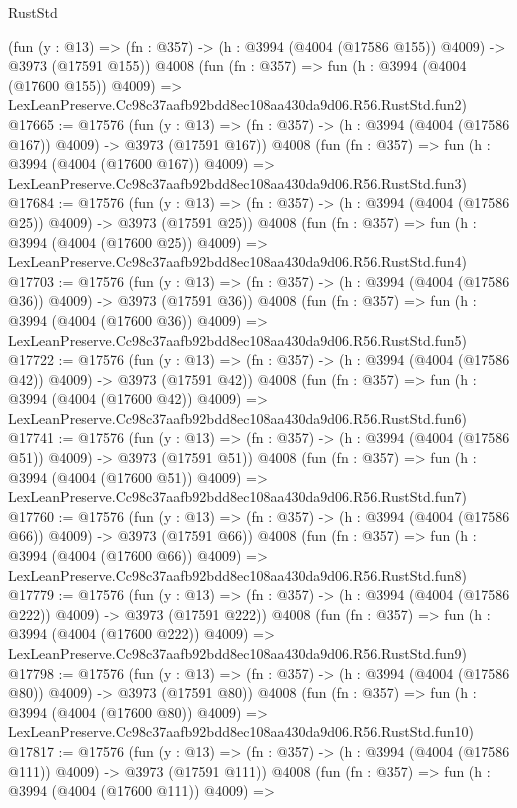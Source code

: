 \begin{lexlean}{RustStd}
\begin{coremodule}
    (fun (y : @13) => (fn : @357) -> (h : @3994 (@4004 (@17586 @155)) @4009) -> @3973 (@17591 @155))
    @4008
    (fun (fn : @357) =>
    fun (h : @3994 (@4004 (@17600 @155)) @4009) =>
    LexLeanPreserve.Cc98c37aafb92bdd8ec108aa430da9d06.R56.RustStd.fun2)
@17665 := @17576
    (fun (y : @13) => (fn : @357) -> (h : @3994 (@4004 (@17586 @167)) @4009) -> @3973 (@17591 @167))
    @4008
    (fun (fn : @357) =>
    fun (h : @3994 (@4004 (@17600 @167)) @4009) =>
    LexLeanPreserve.Cc98c37aafb92bdd8ec108aa430da9d06.R56.RustStd.fun3)
@17684 := @17576
    (fun (y : @13) => (fn : @357) -> (h : @3994 (@4004 (@17586 @25)) @4009) -> @3973 (@17591 @25))
    @4008
    (fun (fn : @357) =>
    fun (h : @3994 (@4004 (@17600 @25)) @4009) =>
    LexLeanPreserve.Cc98c37aafb92bdd8ec108aa430da9d06.R56.RustStd.fun4)
@17703 := @17576
    (fun (y : @13) => (fn : @357) -> (h : @3994 (@4004 (@17586 @36)) @4009) -> @3973 (@17591 @36))
    @4008
    (fun (fn : @357) =>
    fun (h : @3994 (@4004 (@17600 @36)) @4009) =>
    LexLeanPreserve.Cc98c37aafb92bdd8ec108aa430da9d06.R56.RustStd.fun5)
@17722 := @17576
    (fun (y : @13) => (fn : @357) -> (h : @3994 (@4004 (@17586 @42)) @4009) -> @3973 (@17591 @42))
    @4008
    (fun (fn : @357) =>
    fun (h : @3994 (@4004 (@17600 @42)) @4009) =>
    LexLeanPreserve.Cc98c37aafb92bdd8ec108aa430da9d06.R56.RustStd.fun6)
@17741 := @17576
    (fun (y : @13) => (fn : @357) -> (h : @3994 (@4004 (@17586 @51)) @4009) -> @3973 (@17591 @51))
    @4008
    (fun (fn : @357) =>
    fun (h : @3994 (@4004 (@17600 @51)) @4009) =>
    LexLeanPreserve.Cc98c37aafb92bdd8ec108aa430da9d06.R56.RustStd.fun7)
@17760 := @17576
    (fun (y : @13) => (fn : @357) -> (h : @3994 (@4004 (@17586 @66)) @4009) -> @3973 (@17591 @66))
    @4008
    (fun (fn : @357) =>
    fun (h : @3994 (@4004 (@17600 @66)) @4009) =>
    LexLeanPreserve.Cc98c37aafb92bdd8ec108aa430da9d06.R56.RustStd.fun8)
@17779 := @17576
    (fun (y : @13) => (fn : @357) -> (h : @3994 (@4004 (@17586 @222)) @4009) -> @3973 (@17591 @222))
    @4008
    (fun (fn : @357) =>
    fun (h : @3994 (@4004 (@17600 @222)) @4009) =>
    LexLeanPreserve.Cc98c37aafb92bdd8ec108aa430da9d06.R56.RustStd.fun9)
@17798 := @17576
    (fun (y : @13) => (fn : @357) -> (h : @3994 (@4004 (@17586 @80)) @4009) -> @3973 (@17591 @80))
    @4008
    (fun (fn : @357) =>
    fun (h : @3994 (@4004 (@17600 @80)) @4009) =>
    LexLeanPreserve.Cc98c37aafb92bdd8ec108aa430da9d06.R56.RustStd.fun10)
@17817 := @17576
    (fun (y : @13) => (fn : @357) -> (h : @3994 (@4004 (@17586 @111)) @4009) -> @3973 (@17591 @111))
    @4008
    (fun (fn : @357) =>
    fun (h : @3994 (@4004 (@17600 @111)) @4009) =>

\end{coremodule}
\end{lexlean}
